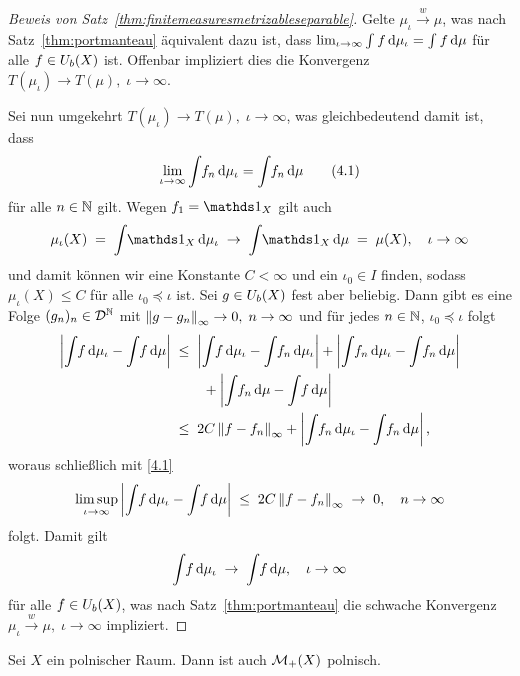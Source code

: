 \documentclass[../main/main.tex]{subfiles}
\begin{document}
\begin{proof}[Beweis von Satz~\ref{thm:finitemeasuresmetrizableseparable}]
		Gelte $\mu_\iota \xrightarrow{w} \mu$, was nach Satz~\ref{thm:portmanteau} äquivalent dazu ist, dass $\lim_{\iota \to \infty} \int_{} \, f \, \mathrm{d}\mu_\iota = \int_{} \, f \, \mathrm{d}\mu$ für alle 
		$f \in U_b(X)$ ist. Offenbar impliziert dies die Konvergenz $T(\mu_\iota) \to T(\mu), \; \iota \to \infty$.
		
		Sei nun umgekehrt $T(\mu_\iota) \to T(\mu), \; \iota \to \infty$, was gleichbedeutend damit ist, dass 
		\[ \lim_{\iota \to \infty} \int_{} \, f_n \, \mathrm{d}\mu_\iota = \int_{} \, f_n \, \mathrm{d}\mu \label{4.1} \tag{4.1} \] 
		für alle $n \in \mathbb{N}$ gilt.
		Wegen $f_1 = \indfct_X$ gilt auch
		\[ \mu_\iota(X) \; = \; \measureint{}{\indfct_X}{\mu_\iota} \; \to \; \measureint{}{\indfct_X}{\mu} \; = \; \mu(X), \quad \iota \to \infty \]
		und damit können wir eine Konstante $C < \infty$ und ein $\iota_0 \in I$ finden, sodass $\mu_\iota(X) \leq C$ für alle $\iota_0 \preceq \iota$ ist.
		Sei $g \in U_b(X)$ fest aber beliebig. Dann gibt es eine Folge $(g_n)_n \in \mathcal{D}^{\mathbb{N}}$ mit $\left\lVert g - g_n\right\rVert_\infty \to 0, \; n \to \infty$ und für jedes $n \in \mathbb{N}$, $\iota_0 \preceq \iota$ folgt
		\begin{align*}
			\left| \int_{} \, f \, \mathrm{d}\mu_\iota - \int_{} \, f \, \mathrm{d}\mu \right| \; &\leq \; 
			\left| \int_{} \, f \, \mathrm{d}\mu_\iota - \int_{} \, f_n \, \mathrm{d}\mu_\iota \right| + 
			\left| \int_{} \, f_n \, \mathrm{d}\mu_\iota - \int_{} \, f_n \, \mathrm{d}\mu \right| \\
			& \qquad + 
			\left| \int_{} \, f_n \, \mathrm{d}\mu - \int_{} \, f \, \mathrm{d}\mu \right| \\
			&\leq \; 2 C \left\lVert f - f_n\right\rVert_\infty + \left| \int_{} \, f_n \, \mathrm{d}\mu_\iota - 
			\int_{} \, f_n \, \mathrm{d}\mu \right| \text{,}
		\end{align*}
		woraus schließlich mit \eqref{4.1}
		\[ \limsup_{\iota \to \infty} \left| \int_{} \, f \, \mathrm{d}\mu_\iota - \int_{} \, f \, \mathrm{d}\mu \right| \; \leq \; 2 C \left\lVert f - f_n\right\rVert_\infty \; \to \; 0, \quad n \to \infty \]
		folgt. Damit gilt 
		\[ \int_{} \, f \, \mathrm{d}\mu_\iota \; \to \; \int_{} \, f \, \mathrm{d}\mu, \quad \iota \to \infty \]
		für alle $f \in U_b(X)$, was nach Satz~\ref{thm:portmanteau} die schwache Konvergenz $\mu_\iota \xrightarrow{w} \mu, \; \iota \to \infty$ impliziert.
	\end{proof}
	
	\begin{Satz}
		Sei $X$ ein polnischer Raum. Dann ist auch $\mathcal{M}_{+}(X)$ polnisch.
	\end{Satz}
	
\end{document}
